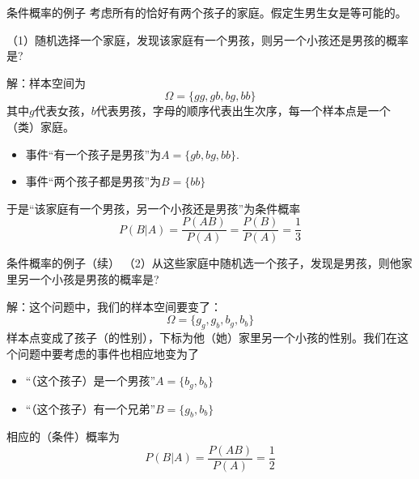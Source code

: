 
\begin{frame}

\begin{block}{条件概率的例子}
考虑所有的恰好有两个孩子的家庭。假定生男生女是等可能的。

\vspace{1em}

（1）{\color{red}随机选择一个家庭}，发现该家庭有一个男孩，则另一个小孩还是男孩的概率是?

\vspace{1em}
\pause

解：样本空间为
\[\Omega = \{gg, gb, bg, bb\}\]
其中$g$代表女孩，$b$代表男孩，字母的顺序代表出生次序，每一个样本点是一个（类）家庭。
\begin{itemize}
\item 事件``有一个孩子是男孩''为$A = \{gb,bg,bb\}$.
\item 事件``两个孩子都是男孩''为$B = \{bb\}$
\end{itemize}

于是``该家庭有一个男孩，另一个小孩还是男孩''为条件概率
\[P(B|A) = \dfrac{P(AB)}{P(A)} = \dfrac{P(B)}{P(A)} = \dfrac{1}{3}\]
\end{block}

\end{frame}


\begin{frame}

\begin{block}{条件概率的例子（续）}
（2）从这些家庭中{\color{red}随机选一个孩子}，发现是男孩，则他家里另一个小孩是男孩的概率是?

\vspace{1em}
\pause

解：这个问题中，我们的样本空间要变了：
\[\Omega = \{g_g, g_b, b_g, b_b\}\]
样本点变成了孩子（的性别），下标为他（她）家里另一个小孩的性别。我们在这个问题中要考虑的事件也相应地变为了
\begin{itemize}
\item ``（这个孩子）是一个男孩''$A = \{b_g, b_b\}$
\item ``（这个孩子）有一个兄弟''$B = \{g_b, b_b\}$
\end{itemize}
相应的（条件）概率为
\[P(B|A) = \dfrac{P(AB)}{P(A)} = \dfrac{1}{2}\]
\end{block}

\end{frame}

